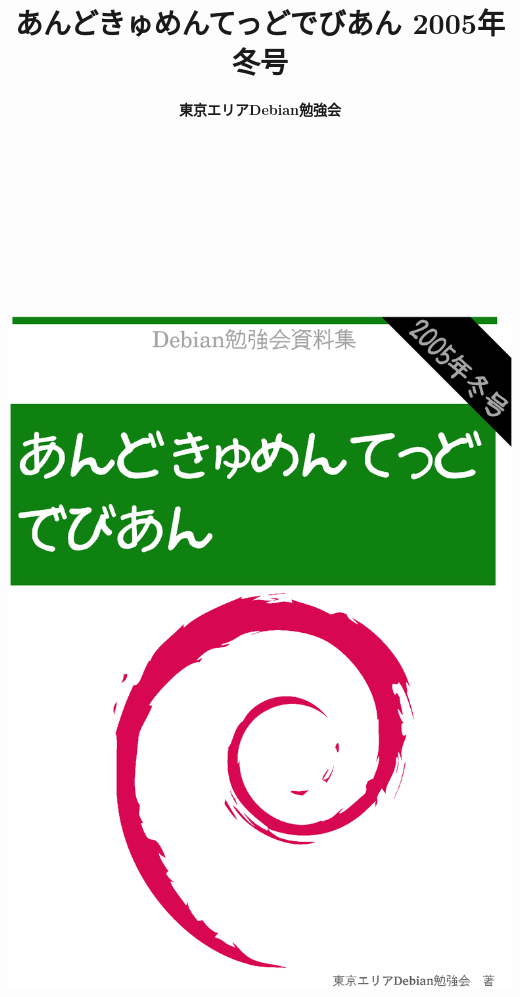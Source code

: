 \documentclass[mingoth,a4paper]{jsarticle}
\begin{document}
\begin{titlepage}
\title{%
あんどきゅめんてっどでびあん 2005年冬号}
\date{}
\author{\bf 東京エリアDebian勉強会} 

\includegraphics[height=252mm]{image2005-fuyu/titlepage-winter.eps}
\end{titlepage}
\end{document}
